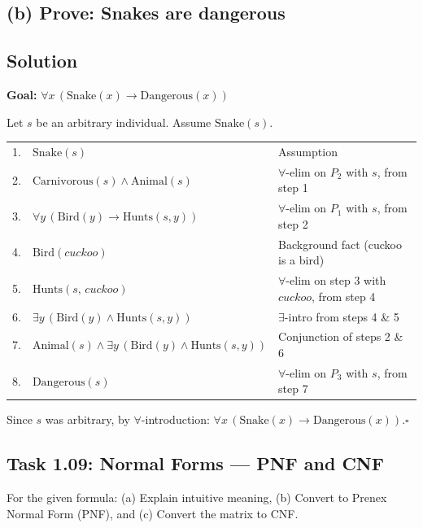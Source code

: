 \documentclass[11pt,a4paper]{article}
\newenvironment{solution}{%
	\begin{tcolorbox}[
		breakable,
		colback=green!4,
		colframe=green!50!black,
		fonttitle=\bfseries,
		title={ Solution},
		left=6pt, right=6pt, top=4pt, bottom=4pt
		]%
	}{%
	\end{tcolorbox}%
}
\begin{document}
\subsection*{(b) Prove: Snakes are dangerous}

\subsection*{Solution}
\begin{solution}
\textbf{Goal:} $\forall x\,(\mathrm{Snake}(x) \to \mathrm{Dangerous}(x))$

\medskip
Let $s$ be an arbitrary individual. Assume $\mathrm{Snake}(s)$.

\medskip
\begin{tabular}{r l l}
1. & $\mathrm{Snake}(s)$ & Assumption \\
2. & $\mathrm{Carnivorous}(s) \land \mathrm{Animal}(s)$ & $\forall$-elim on $P_2$ with $s$, from step 1 \\
3. & $\forall y\,(\mathrm{Bird}(y) \to \mathrm{Hunts}(s,y))$ & $\forall$-elim on $P_1$ with $s$, from step 2 \\
4. & $\mathrm{Bird}(\mathit{cuckoo})$ & Background fact (cuckoo is a bird) \\
5. & $\mathrm{Hunts}(s,\,\mathit{cuckoo})$ & $\forall$-elim on step 3 with $\mathit{cuckoo}$, from step 4 \\
6. & $\exists y\,(\mathrm{Bird}(y) \land \mathrm{Hunts}(s,y))$ & $\exists$-intro from steps 4 \& 5 \\
7. & $\mathrm{Animal}(s) \land \exists y\,(\mathrm{Bird}(y) \land \mathrm{Hunts}(s,y))$ & Conjunction of steps 2 \& 6 \\
8. & $\mathrm{Dangerous}(s)$ & $\forall$-elim on $P_3$ with $s$, from step 7 \\
\end{tabular}

\medskip
Since $s$ was arbitrary, by $\forall$-introduction: $\forall x\,(\mathrm{Snake}(x) \to \mathrm{Dangerous}(x))$.\hfill$\square$
\end{solution}
\subsection*{Task 1.09: Normal Forms — PNF and CNF}

For the given formula: (a) Explain intuitive meaning, (b) Convert to Prenex Normal Form (PNF), and (c) Convert the matrix to CNF.
\end{document}
